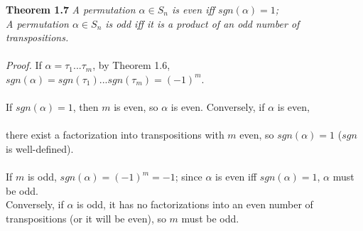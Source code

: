 \documentclass{article}
\begin{document}
\begin{redrules}\color{red}
\textbf{Theorem 1.7} \textit{A permutation \(\alpha\in S_n\) is even iff \(sgn(\alpha)=1\);\\A permutation \(\alpha\in S_n\) is odd iff it is a product of an odd number of transpositions.}\\\\\color{black}
\textit{Proof.} If \(\alpha=\tau_1...\tau_m\), by \color{gray}Theorem 1.6\color{black}, \(sgn(\alpha)=sgn(\tau_1)...sgn(\tau_m)=(-1)^m\).\\\\
If \(sgn(\alpha)=1\), then \(m\) is even, so \(\alpha\) is even. Conversely, if \(\alpha\) is even,\\\\
there exist a factorization into transpositions with \(m\) even, so \(sgn(\alpha)=1\) (\(sgn\) is well-defined).\\\\
If \(m\) is odd, \(sgn(\alpha)=(-1)^m=-1\); since \(\alpha\) is even iff \(sgn(\alpha)=1\), \(\alpha\) must be odd.\\
Conversely, if \(\alpha\) is odd, it has no factorizations into an even number of transpositions (or it will be even), so \(m\) must be odd.
\end{redrules}
\end{document}
